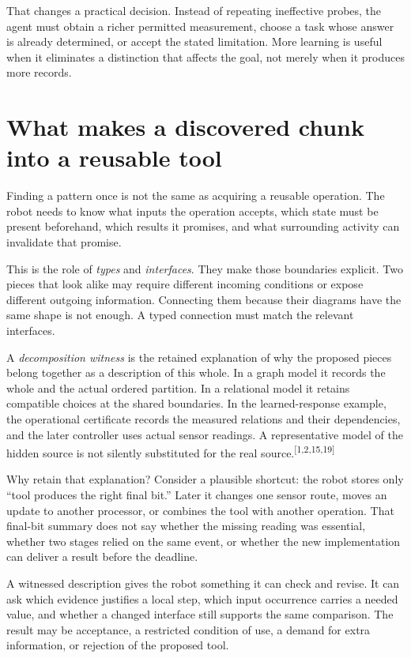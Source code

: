 \documentclass[11pt]{article}
\newcommand{\sn}[1]{\textsuperscript{[#1]}}
\begin{document}
That changes a practical decision. Instead of repeating ineffective probes, the agent must obtain a richer permitted measurement, choose a task whose answer is already determined, or accept the stated limitation. More learning is useful when it eliminates a distinction that affects the goal, not merely when it produces more records.

\section{What makes a discovered chunk into a reusable tool}

Finding a pattern once is not the same as acquiring a reusable operation. The robot needs to know what inputs the operation accepts, which state must be present beforehand, which results it promises, and what surrounding activity can invalidate that promise.

This is the role of \emph{types} and \emph{interfaces}. They make those boundaries explicit. Two pieces that look alike may require different incoming conditions or expose different outgoing information. Connecting them because their diagrams have the same shape is not enough. A typed connection must match the relevant interfaces.

A \emph{decomposition witness} is the retained explanation of why the proposed pieces belong together as a description of this whole. In a graph model it records the whole and the actual ordered partition. In a relational model it retains compatible choices at the shared boundaries. In the learned-response example, the operational certificate records the measured relations and their dependencies, and the later controller uses actual sensor readings. A representative model of the hidden source is not silently substituted for the real source.\sn{1,2,15,19}

Why retain that explanation? Consider a plausible shortcut: the robot stores only ``tool produces the right final bit.'' Later it changes one sensor route, moves an update to another processor, or combines the tool with another operation. That final-bit summary does not say whether the missing reading was essential, whether two stages relied on the same event, or whether the new implementation can deliver a result before the deadline.

A witnessed description gives the robot something it can check and revise. It can ask which evidence justifies a local step, which input occurrence carries a needed value, and whether a changed interface still supports the same comparison. The result may be acceptance, a restricted condition of use, a demand for extra information, or rejection of the proposed tool.
\end{document}
